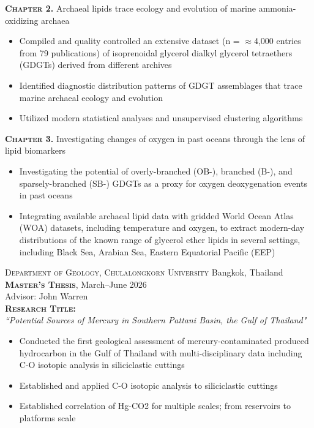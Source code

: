 \documentclass[10pt, letter]{article}
\begin{document}
\bigskip
\textbf{\textsc{Chapter 2.}} Archaeal lipids trace ecology and evolution of marine ammonia-oxidizing archaea
\begin{itemize}[leftmargin=*]
    \item Compiled and quality controlled an extensive dataset (n = $\approx$4,000 entries from 79 publications) of isoprenoidal glycerol dialkyl glycerol tetraethers (GDGTs) derived from different archives
    \item Identified diagnostic distribution patterns of GDGT assemblages that trace marine archaeal ecology and evolution
    \item Utilized modern statistical analyses and unsupervised clustering algorithms
\end{itemize}    


\textbf{\textsc{Chapter 3.}} Investigating changes of oxygen in past oceans through the lens of lipid biomarkers
\begin{itemize}[leftmargin=*]
    \item Investigating the potential of overly-branched (OB-), branched (B-), and sparsely-branched (SB-) GDGTs as a proxy for oxygen deoxygenation events in past oceans
    \item Integrating available archaeal lipid data with gridded World Ocean Atlas (WOA) datasets, including temperature and oxygen, to extract modern-day distributions of the known range of glycerol ether lipids in several settings, including Black Sea, Arabian Sea, Eastern Equatorial Pacific (EEP)
\end{itemize}  

\bigskip
\textsc{Department of Geology, Chulalongkorn University} \hfill Bangkok, Thailand \\
\textsc{\textbf{Master's Thesis}}, March--June 2026 \\
Advisor: John Warren \\

\textbf{\textsc{Research Title:}} \\
\textit{``Potential Sources of Mercury in Southern Pattani Basin, the Gulf of Thailand"} 

\begin{itemize}[leftmargin=*]
    \item Conducted the first geological assessment of mercury-contaminated produced hydrocarbon in the Gulf of Thailand with multi-disciplinary data including C-O isotopic analysis in siliciclastic cuttings
    \item Established and applied C-O isotopic analysis to siliciclastic cuttings
    \item Established correlation of Hg-CO2 for multiple scales; from reservoirs to platforms scale
\end{itemize}  
\end{document}
